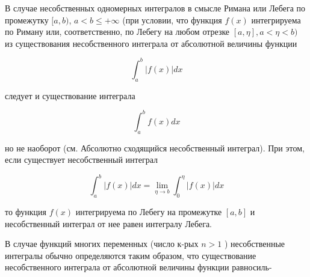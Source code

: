 \documentclass[10pt]{article}
\begin{document}
В случае несобственных одномерных интегралов в смысле Римана или Лебега по промежутку $[a, b)$, $a<b \leqslant+\infty$ (при условии, что функция $f(x)$ интегрируема по Риману или, соответственно, по Лебегу на любом отрезке $[a, \eta], a<\eta<b)$ из существования несобственного интеграла от абсолютной величины функции



\[

\int_{a}^{b}|f(x)| d x

\]



следует и существование интеграла



\[

\int_{a}^{b} f(x) d x

\]



но не наоборот (см. Абсолютно сходящийся несобственный интеграл). При этом, если существует несобственный интеграл



\[

\int_{a}^{b}|f(x)| d x=\lim _{\eta \rightarrow b} \int_{0}^{\eta}|f(x)| d x

\]



то функция $f(x)$ интегрируема по Лебегу на промежутке $[a, b]$ и несобственный интеграл от нее равен интегралу Лебега.



В случае функций многих переменных (число к-рых $n>1$ ) несобственные интегралы обычно определяются таким образом, что существование несобственного интеграла от абсолютной величины функции равносиль-
\end{document}
